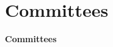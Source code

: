 \documentclass[
letterpaper, %
11pt, %
onecolumn, %
openany, %
]{article}
\begin{document}
                                                    
\cleardoublepage
\section{Committees} 
\pagestyle{plain}
\noindent\textbf{\Huge Committees}
\newline

 








\end{document}
